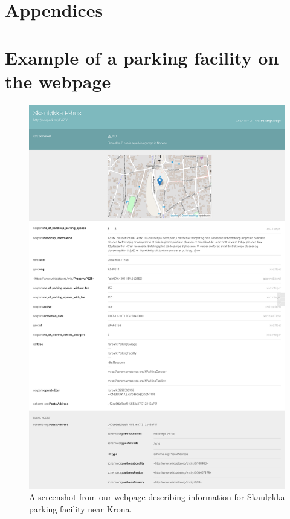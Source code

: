 \chapter*{Appendices}
\appendix

\chapter{Example of a parking facility on the webpage}
\label{appendix:webpage}
\begin{figure}[H]
	\centering
	\includegraphics[scale=0.20]{figures/parking-place-screenshot.png}
	\caption{A screenshot from our webpage describing information for Skauløkka parking facility near Krona.}
\end{figure}

